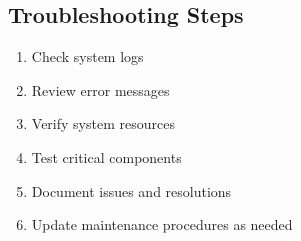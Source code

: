 \subsection{Troubleshooting Steps}
\begin{enumerate}
    \item Check system logs
    \item Review error messages
    \item Verify system resources
    \item Test critical components
    \item Document issues and resolutions
    \item Update maintenance procedures as needed
\end{enumerate}